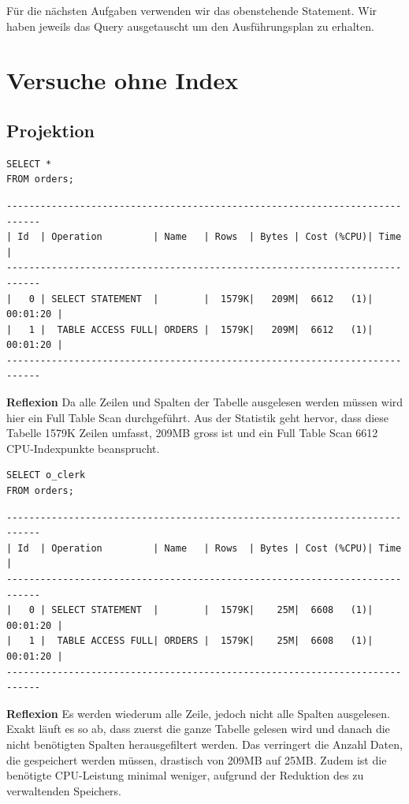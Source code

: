 \documentclass[10pt]{article}
\begin{document}
Für die nächsten Aufgaben verwenden wir das obenstehende Statement. Wir 
haben jeweils das Query ausgetauscht um den Ausführungsplan zu erhalten.

\section{Versuche ohne Index}
\subsection{Projektion}
\begin{lstlisting}[style=sql]
SELECT *
FROM orders;
\end{lstlisting}
\begin{lstlisting}[style=queryexecutionplan]
----------------------------------------------------------------------------
| Id  | Operation         | Name   | Rows  | Bytes | Cost (%CPU)| Time     |
----------------------------------------------------------------------------
|   0 | SELECT STATEMENT  |        |  1579K|   209M|  6612   (1)| 00:01:20 |
|   1 |  TABLE ACCESS FULL| ORDERS |  1579K|   209M|  6612   (1)| 00:01:20 |
---------------------------------------------------------------------------- 
\end{lstlisting}   
\textbf{Reflexion} \newline
Da alle Zeilen und Spalten der Tabelle ausgelesen werden müssen wird hier ein
Full Table Scan durchgeführt. Aus der Statistik geht hervor, dass diese Tabelle
1579K Zeilen umfasst, 209MB gross ist und ein Full Table Scan 6612 CPU-Indexpunkte
beansprucht.

\begin{lstlisting}[style=sql]
SELECT o_clerk
FROM orders;
\end{lstlisting}
\begin{lstlisting}[style=queryexecutionplan]
----------------------------------------------------------------------------
| Id  | Operation         | Name   | Rows  | Bytes | Cost (%CPU)| Time     |
----------------------------------------------------------------------------
|   0 | SELECT STATEMENT  |        |  1579K|    25M|  6608   (1)| 00:01:20 |
|   1 |  TABLE ACCESS FULL| ORDERS |  1579K|    25M|  6608   (1)| 00:01:20 |
---------------------------------------------------------------------------- 
\end{lstlisting}   
\textbf{Reflexion} \newline
Es werden wiederum alle Zeile, jedoch nicht alle Spalten ausgelesen.
Exakt läuft es so ab, dass zuerst die ganze Tabelle gelesen wird und danach die nicht
benötigten Spalten herausgefiltert werden.
Das verringert die Anzahl Daten, die gespeichert werden müssen, drastisch von 209MB auf 25MB.
Zudem ist die benötigte CPU-Leistung minimal weniger, aufgrund der Reduktion des
zu verwaltenden Speichers.
\end{document}
